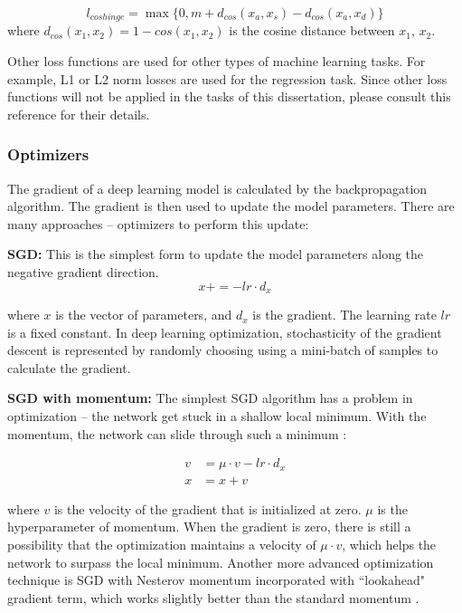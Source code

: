 \begin{equation}
l_{cos hinge} = \max\{0, m + d_{cos}(x_a, x_s) − d_{cos}(x_a, x_d)\} 
\end{equation}
where $d_{cos}(x_1, x_2) = 1 − cos(x_1, x_2)$ is the cosine distance between $x_1$, $x_2$. 

Other loss functions are used for other types of machine learning tasks. For example, L1 or L2 norm losses are used for the regression task. Since other loss functions will not be applied in the tasks of this dissertation, please consult this reference \cite{Stanforduniversity} for their details.

\subsubsection{Optimizers}

The gradient of a deep learning model is calculated by the backpropagation algorithm. The gradient is then used to update the model parameters. There are many approaches -- optimizers to perform this update:

\noindent\textbf{\gls{SGD}:} This is the simplest form to update the model parameters along the negative gradient direction. 
\begin{equation}
x += - lr \cdot d_x
\end{equation}

where $x$ is the vector of parameters, and $d_x$ is the gradient. The learning rate $lr$ is a fixed constant. In deep learning optimization, stochasticity of the gradient descent is represented by randomly choosing using a mini-batch of samples to calculate the gradient.

\noindent\textbf{SGD with momentum:} The simplest \gls{SGD} algorithm has a problem in optimization -- the network get stuck in a shallow local minimum. With the momentum, the network can slide through such a minimum \cite{MATLAB}:

\begin{align}
v &= \mu \cdot v - lr \cdot d_x \\
x &= x + v
\end{align}

where $v$ is the velocity of the gradient that is initialized at zero. $\mu$ is the hyperparameter of momentum. When the gradient is zero, there is still a possibility that the optimization maintains a velocity of $\mu \cdot v$, which helps the network to surpass the local minimum. Another more advanced optimization technique is \gls{SGD} with Nesterov momentum incorporated with ``lookahead" gradient term, which works slightly better than the standard momentum \cite{Bengio2012}.

